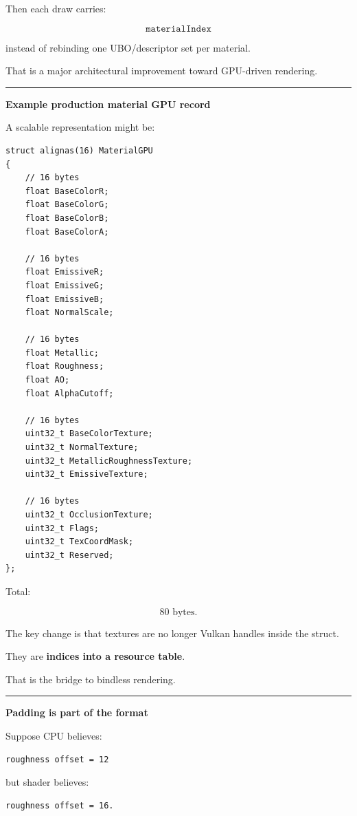 Then each draw carries:

\[
\texttt{materialIndex}
\]

instead of rebinding one UBO/descriptor set per material.

That is a major architectural improvement toward GPU-driven rendering.

\begin{center}\rule{0.5\linewidth}{0.5pt}\end{center}

\textbf{Example production material GPU record}

A scalable representation might be:

\begin{verbatim}
struct alignas(16) MaterialGPU
{
    // 16 bytes
    float BaseColorR;
    float BaseColorG;
    float BaseColorB;
    float BaseColorA;

    // 16 bytes
    float EmissiveR;
    float EmissiveG;
    float EmissiveB;
    float NormalScale;

    // 16 bytes
    float Metallic;
    float Roughness;
    float AO;
    float AlphaCutoff;

    // 16 bytes
    uint32_t BaseColorTexture;
    uint32_t NormalTexture;
    uint32_t MetallicRoughnessTexture;
    uint32_t EmissiveTexture;

    // 16 bytes
    uint32_t OcclusionTexture;
    uint32_t Flags;
    uint32_t TexCoordMask;
    uint32_t Reserved;
};
\end{verbatim}

Total:

\[
80\text{ bytes}.
\]

The key change is that textures are no longer Vulkan handles inside the struct.

They are \textbf{indices into a resource table}.

That is the bridge to bindless rendering.

\begin{center}\rule{0.5\linewidth}{0.5pt}\end{center}

\textbf{Padding is part of the format}

Suppose CPU believes:

\begin{verbatim}
roughness offset = 12
\end{verbatim}

but shader believes:

\begin{verbatim}
roughness offset = 16.
\end{verbatim}

